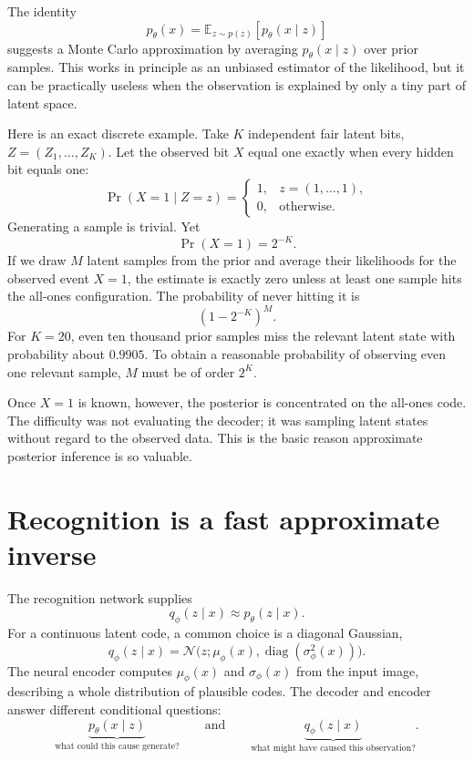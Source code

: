 The identity
\[
 p_\theta(x)=\mathbb E_{z\sim p(z)}[p_\theta(x\mid z)]
\]
suggests a Monte Carlo approximation by averaging \(p_\theta(x\mid z)\) over prior samples. This works in principle as an unbiased estimator of the likelihood, but it can be practically useless when the observation is explained by only a tiny part of latent space.

Here is an exact discrete example. Take \(K\) independent fair latent bits, \(Z=(Z_1,\ldots,Z_K)\). Let the observed bit \(X\) equal one exactly when every hidden bit equals one:
\[
 \Pr(X=1\mid Z=z)=
 \begin{cases}
 1,&z=(1,\ldots,1),\\
 0,&\text{otherwise}.
 \end{cases}
\]
Generating a sample is trivial. Yet
\[
 \boxed{\Pr(X=1)=2^{-K}.}
\]
If we draw \(M\) latent samples from the prior and average their likelihoods for the observed event \(X=1\), the estimate is exactly zero unless at least one sample hits the all-ones configuration. The probability of never hitting it is
\[
 \boxed{\left(1-2^{-K}\right)^M.}
\]
For \(K=20\), even ten thousand prior samples miss the relevant latent state with probability about \(0.9905\). To obtain a reasonable probability of observing even one relevant sample, \(M\) must be of order \(2^K\).

Once \(X=1\) is known, however, the posterior is concentrated on the all-ones code. The difficulty was not evaluating the decoder; it was sampling latent states without regard to the observed data. This is the basic reason approximate posterior inference is so valuable.

\section{Recognition is a fast approximate inverse}

The recognition network supplies
\[
 q_\phi(z\mid x)\approx p_\theta(z\mid x).
\]
For a continuous latent code, a common choice is a diagonal Gaussian,
\[
 q_\phi(z\mid x)
 =\mathcal N\bigl(z;
      \mu_\phi(x),\operatorname{diag}(\sigma_\phi^2(x))\bigr).
\]
The neural encoder computes \(\mu_\phi(x)\) and \(\sigma_\phi(x)\) from the input image, describing a whole distribution of plausible codes. The decoder and encoder answer different conditional questions:
\[
 \underbrace{p_\theta(x\mid z)}_{\text{what could this cause generate?}}
 \qquad\text{and}\qquad
 \underbrace{q_\phi(z\mid x)}_{\text{what might have caused this observation?}}.
\]

